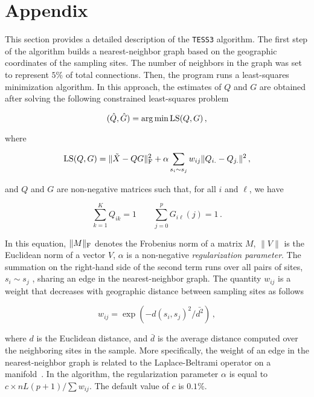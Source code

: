 \section*{Appendix}

This section provides a detailed description of the {\tt TESS3} algorithm.  The first step of the algorithm builds a nearest-neighbor graph based on the geographic coordinates of the sampling sites. The number of neighbors in the graph was set to represent $5\%$ of total connections. Then, the program runs a least-squares minimization algorithm.  In this approach, the estimates of $Q$ and $G$ are obtained after solving the following constrained least-squares problem~\citep{cai2011graph}

$$
(\hat Q, \hat G) = \arg \min {\rm LS}(Q, G) \, ,
$$

\noindent where

\begin{equation}\label{eq:LS}
{\rm LS}(Q, G) =  \|  \tilde{X} - QG \|^2_{\rm F}   +   \alpha   \sum_{s_i \sim s_j}   w_{ij} \|  Q_{i.}  - Q_{j.} \|^2   \, , 
\end{equation}

\noindent and $Q$ and $G$ are non-negative matrices such that, for all $i$ and $\ell$, we have  

$$
\sum_{k=1}^K Q_{ik} = 1  \qquad \sum_{j=0}^{p} G_{i\ell}(j) = 1 \, .
$$

\noindent In this equation, $\| M \|_{\rm F}$ denotes the Frobenius norm of a matrix $M$,  $\| V \|$ is the Euclidean norm of a vector $V$, $\alpha$ is a non-negative {\it regularization parameter}. The summation on the right-hand side of the second term runs over all pairs of sites, $s_i \sim s_j$ , sharing an edge in the nearest-neighbor graph. The quantity $w_{ij}$ is a weight that decreases with geographic distance between sampling sites as follows

\begin{equation} 
w_{ij} =\exp( -  d(s_i, s_j)^2 / \bar{d^2}  ) \, ,  
\end{equation}

\noindent where $d$ is the Euclidean distance, and $\bar{d}$ is the average distance computed over the neighboring sites in the sample. More specifically, the weight of an edge in the nearest-neighbor graph is related to the Laplace-Beltrami operator on a manifold~\citep{belkin2003laplacian}. In the algorithm, the regularization parameter $\alpha$ is equal to $c \times nL(p+1) / \sum w_{ij}$. The default value of $c$ is $0.1\%$.


